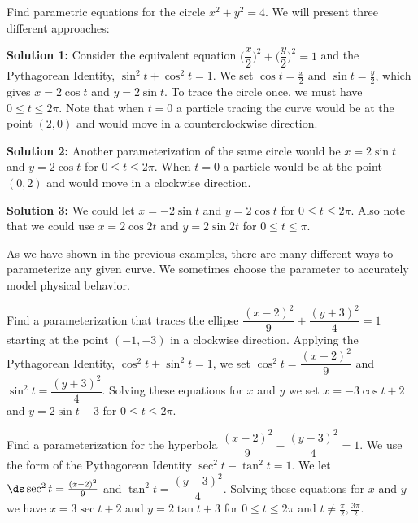 \begin{example}\label{ex_par_circle}
Find parametric equations for the circle $x^2+y^2=4$.
\solution
We will present three different approaches:

\textbf{Solution 1:} Consider the equivalent equation $\biggl(\dfrac{x}{2}\biggr)^2+ \biggl(\dfrac{y}{2}\biggr)^2=1$ and the Pythagorean Identity, $\sin^2t+\cos^2 t=1$. We set $\cos t=\frac{x}{2}$ and $\sin t=\frac{y}{2}$, which gives $x=2\cos t$ and $y=2\sin t$. To trace the circle once, we must have $0\leq t \leq 2\pi$. Note that when $t=0$ a particle tracing the curve would be at the point $(2,0)$ and would move in a counterclockwise direction.

\textbf{Solution 2:} Another parameterization of the same circle would be $x=2\sin t$ and $y=2\cos t$ for $0\leq t \leq 2\pi$. When $t=0$ a particle would be at the point $(0,2)$ and would move in a clockwise direction.

\textbf{Solution 3:} We could let $x=-2\sin t$ and $y=2\cos t$ for $0\leq t \leq 2\pi$. Also note that we could use $x=2\cos 2t$ and $y=2\sin 2t$ for $0\leq t \leq \pi$.
\end{example}

As we have shown in the previous examples, there are many different ways to parameterize any given curve. We sometimes choose the parameter to accurately model physical behavior.

\begin{example}\label{ex_para_ellipse}
Find a parameterization that traces the ellipse $\dfrac{(x-2)^2}{9}+\dfrac{(y+3)^2}{4}=1$ starting at the point $(-1,-3)$ in a clockwise direction.
\solution
Applying the Pythagorean Identity, $\cos^2t+\sin^2t=1$, we set $\cos^2 t=\dfrac{(x-2)^2}{9}$ and $\sin^2 t=\dfrac{(y+3)^2}{4}$. Solving these equations for $x$ and $y$ we set $x=-3\cos t+2$ and $y=2\sin t-3$  for $0\leq t\leq 2\pi$.
\end{example}

\begin{example}\label{ex_para_hyper}
Find a parameterization for the hyperbola $\dfrac{(x-2)^2}{9}-\dfrac{(y-3)^2}{4}=1$.
\solution
We use the form of the Pythagorean Identity $\sec^2t-\tan^2t=1$. We let  $\ds \sec^2 t=\frac{(x-2)^2}{9}$ and $\tan^2 t=\dfrac{(y-3)^2}{4}$. Solving these equations for $x$ and $y$ we have $x=3\sec t +2$ and $y=2\tan t +3$ for $0\leq t\leq 2\pi$ and $t\neq\frac\pi2,\frac{3\pi}2$.
\end{example}

